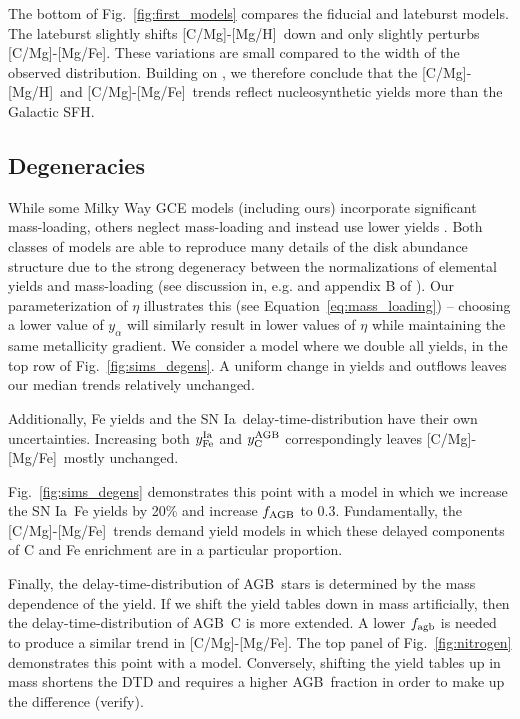 \documentclass[fleqn,
usenatbib]{mnras}
\newcommand{\agb}{AGB}
\newcommand{\gce}{GCE}
\newcommand{\ia}{SN Ia}
\newcommand{\caah}{[C/Mg]-[Mg/H]}
\newcommand{\caafe}{[C/Mg]-[Mg/Fe]}
\newcommand{\Ycagb}{\ensuremath{y_{\rm C}^{\rm AGB}}}
\begin{document}
The bottom of Fig.~\ref{fig:first_models} compares the fiducial and lateburst models. The lateburst slightly shifts \caah\ down and only slightly perturbs \caafe. These variations are small compared to the width of the observed distribution. 
Building on \citet{james+23}, we therefore conclude that the \caah\ and \caafe\ trends reflect nucleosynthetic yields more than the Galactic SFH. 



\subsection{Degeneracies} \label{sec:outflows}

While some Milky Way \gce{} models (including ours) incorporate significant mass-loading, others
neglect mass-loading and instead use lower yields \citep[e.g.][]{MCM13, MCM14, spitoni19, spitoni20, spitoni21}.
Both classes of models are able to reproduce many details of the disk abundance structure due to the strong degeneracy between the normalizations of elemental yields and mass-loading (see discussion in, e.g. \citealt{sandford+22} and appendix B of \citealt{james+23}). 
Our parameterization of $\eta$ illustrates this (see Equation~\ref{eq:mass_loading}) -- choosing a lower value of $y_{\alpha}$ will similarly result in lower values of $\eta$ while maintaining the same metallicity gradient. 
We consider a model where we double all yields, in the top row of Fig.~\ref{fig:sims_degens}. A uniform change in yields and outflows leaves our median trends relatively unchanged. 

Additionally, Fe yields and the \ia\  delay-time-distribution have their own uncertainties. Increasing both $y_{\rm Fe}^{\rm Ia}$ and $\Ycagb$ correspondingly leaves \caafe\ mostly unchanged. 

Fig.~\ref{fig:sims_degens} demonstrates this point with a model in which we increase the \ia\ Fe yields by 20\% and increase $f_{\rm AGB}$ to 0.3. 
Fundamentally, the \caafe\ trends demand yield models in which these delayed components of C and Fe enrichment are in a particular proportion.

Finally, the delay-time-distribution of \agb\ stars is determined by the mass dependence of the yield. If we shift the yield tables down in mass artificially, then the delay-time-distribution of \agb\ C is more extended. A lower $f_{\rm agb}$ is needed to produce a similar trend in \caafe{}. The top panel of Fig.~\ref{fig:nitrogen} demonstrates this point with a model. 
Conversely, shifting the yield tables up in mass shortens the DTD and requires a higher \agb\ fraction in order to make up the difference (verify). 
\end{document}
